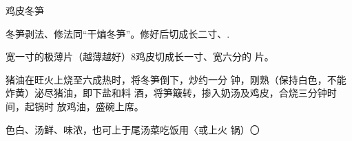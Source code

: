 \begin{recipe}{鸡皮冬笋}

\ingredients


\cooking

\step 冬笋剥法、修法同“干煸冬笋”。修好后切成长二寸、.

宽一寸的极薄片（越薄越好）8鸡皮切成长一寸、宽六分的 片。

\step 猪油在旺火上烧至六成热时，将冬笋倒下，炒约一分 钟，刚熟（保持白色，不能炸黄）泌尽猪油，即下盐和料 酒，将笋簸转，掺入奶汤及鸡皮，合烧三分钟时间，起锅时 放鸡油，盛碗上席。

\notes

色白、汤鲜、味浓，也可上于尾汤菜吃饭用〈或上火 锅）〇

\end{recipe}

